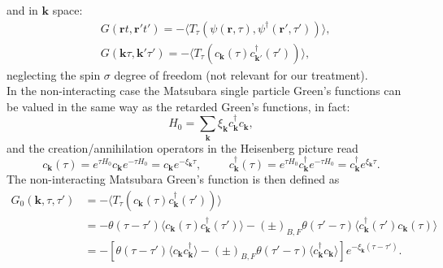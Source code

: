 \documentclass[12pt, a4paper]{report}
\numberwithin{equation}{section}
\begin{document}
and in $\mathbf{k}$ space:
\begin{equation}
\begin{split}
    &G(\mathbf{r}t,\mathbf{r}'t')=-\langle T_\tau\left(\psi(\mathbf{r},\tau),\psi^\dagger(\mathbf{r}',\tau')\right)\rangle,\\
    &G(\mathbf{k}\tau,\mathbf{k}'\tau')=-\langle T_\tau\left(c_{\mathbf{k}}(\tau)c^\dagger_{\mathbf{k}'}(\tau')\right)\rangle,
\end{split}
\end{equation}
neglecting the spin $\sigma$ degree of freedom (not relevant for our treatment).\\
In the non-interacting case the Matsubara single particle Green's functions can be valued in the same way as the retarded Green's functions, 
in fact:
\begin{equation}
    H_0=\sum_{\mathbf{k}}\xi_\mathbf{k}c^\dagger_\mathbf{k}c_\mathbf{k},
\end{equation}
and the creation/annihilation operators in the Heisenberg picture read
\begin{equation}
    c_\mathbf{k}(\tau)=e^{\tau H_0}c_\mathbf{k}e^{-\tau H_0}=c_\mathbf{k}e^{-\xi_\mathbf{k}\tau},\hspace{1cm}c^\dagger_\mathbf{k}(\tau)=e^{\tau H_0}c^\dagger_\mathbf{k}e^{-\tau H_0}=c^\dagger_\mathbf{k}e^{\xi_\mathbf{k}\tau}.
\end{equation}
The non-interacting Matsubara Green's function is then defined as 
\begin{equation}
\begin{split}
    G_0(\mathbf{k},\tau,\tau')&=-\langle T_\tau\left(c_\mathbf{k}(\tau)c^\dagger_\mathbf{k}(\tau')\right)\rangle\\
    &=-\theta(\tau-\tau')\langle c_\mathbf{k}(\tau)c^\dagger_\mathbf{k}(\tau')\rangle-(\pm)_{B,F}\theta(\tau'-\tau)\langle c^\dagger_\mathbf{k}(\tau')c_\mathbf{k}(\tau)\rangle\\
    &=-\left[\theta(\tau-\tau')\langle c_\mathbf{k}c^\dagger_\mathbf{k}\rangle-(\pm)_{B,F}\theta(\tau'-\tau)\langle c_\mathbf{k}^\dagger c_\mathbf{k}\rangle\right]e^{-\xi_\mathbf{k}(\tau-\tau')}.
    \label{free_propagator}
\end{split}
\end{equation}
\end{document}
